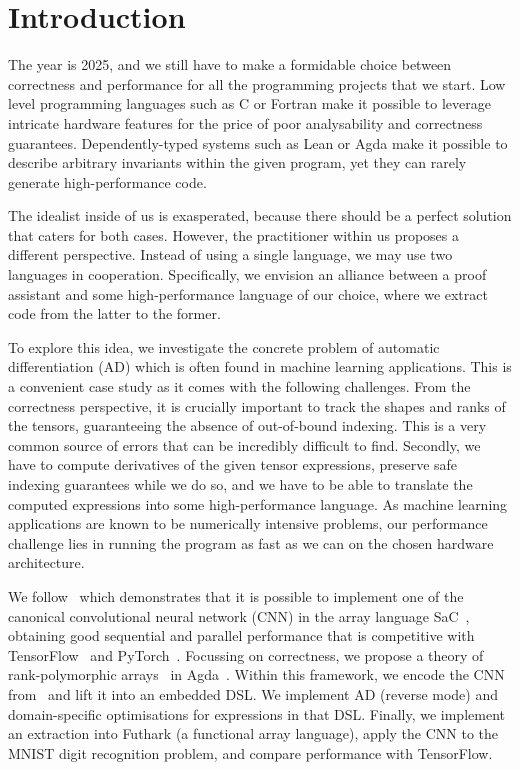 \section{Introduction\label{sec:intro}}

The year is 2025, and we still have to make a formidable choice between
correctness and performance for all the programming projects that we start.
Low level programming languages such as C or Fortran make it possible to leverage
intricate hardware features for the price of poor analysability and
correctness guarantees.  Dependently-typed systems such as Lean or Agda make it possible
to describe arbitrary invariants within the given program, yet they can
rarely generate high-performance code.

The idealist inside of us is exasperated, because there should be a
perfect solution that caters for both cases. However, the practitioner
within us proposes a different perspective. Instead of using a single
language, we may use two languages in cooperation. Specifically, we
envision an alliance between a proof assistant and some
high-performance language of our choice, where we extract code from
the latter to the former.

To explore this idea, we investigate the concrete problem of automatic differentiation (AD) which
is often found in machine learning applications.  This is a convenient case study
as it comes with the following challenges.  From the correctness perspective,
it is crucially important to track the shapes and ranks of the tensors,
guaranteeing the absence of out-of-bound indexing.
This is a very common source of errors that can be incredibly difficult
to find.   Secondly, we have to compute derivatives of the given tensor expressions,
preserve safe indexing guarantees while we do so, and we have to be able to translate
the computed expressions into some high-performance language.
As machine learning applications
are known to be numerically intensive problems, our performance challenge lies
in running the program as fast as we can on the chosen hardware architecture.

We follow~\cite{cnn-array} which demonstrates that it is possible to implement
one of the canonical convolutional neural network (CNN) in the array
language SaC~\cite{sac1, sac2}, obtaining good sequential and parallel performance
that is competitive with TensorFlow~\cite{ad-tf} and PyTorch~\cite{ad-pytorch}.
Focussing on correctness, we propose
a theory of rank-polymorphic arrays~\cite{rank-poly} in Agda~\cite{agda-2-6-3}.
Within this framework, we encode the CNN from~\cite{cnn-array} and lift it 
into an embedded DSL.  We implement AD
(reverse mode) and domain-specific optimisations for expressions in that DSL.
Finally, we implement an extraction 
into Futhark (a functional array language), apply the CNN to the MNIST digit recognition problem,
and compare performance with TensorFlow.

